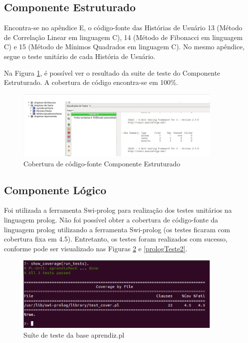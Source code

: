 \subsection{Componente Estruturado}
Encontra-se no apêndice E, o código-fonte das Histórias de Usuário 13 (Método de Correlação Linear em linguagem C), 14 (Método de Fibonacci em linguagem C) e 15 (Método de Mínimos Quadrados em linguagem C). No mesmo apêndice, segue o teste
unitário de cada História de Usuário.

Na Figura \ref{testeC}, é possível ver o resultado da suite de teste do Componente Estruturado. A cobertura de código encontra-se em 100\%.

\begin{figure}[H]
\centering
\includegraphics[width=0.9\textwidth]{figuras/testeC}
\caption{Cobertura de código-fonte Componente Estruturado}
\label{testeC}
\end{figure}

\subsection{Componente Lógico}
Foi utilizada a ferramenta Swi-prolog para realização dos testes unitários na linguagem prolog. Não foi possível obter a cobertura de código-fonte da linguagem prolog utilizando a ferramenta Swi-prolog (os testes ficaram com cobertura fixa em 4.5). Entretanto, os testes foram realizados com sucesso, conforme pode ser visualizado nas Figuras \ref{prologTeste1} e \ref{prologTeste2}. 

\begin{figure}[H]
\centering
\includegraphics[width=0.9\textwidth]{figuras/prologTeste1}
\caption{Suíte de teste da base aprendiz.pl}
\label{prologTeste1}
\end{figure}

